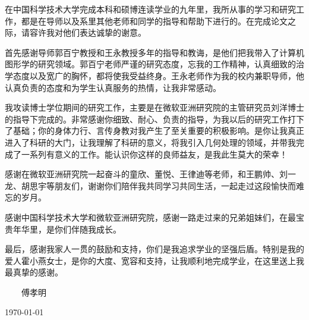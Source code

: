 ﻿
\begin{thanks}

在中国科学技术大学完成本科和硕博连读学业的九年里，我所从事的学习和研究工作，都是在导师以及系里其他老师和同学的指导和帮助下进行的。在完成论文之际，请容许我对他们表达诚挚的谢意。

首先感谢导师郭百宁教授和王永教授多年的指导和教诲，是他们把我带入了计算机图形学的研究领域。郭百宁老师严谨的研究态度，忘我的工作精神，认真细致的治学态度以及宽广的胸怀，都将使我受益终身。王永老师作为我的校内兼职导师，他认真负责的态度和为学生认真服务的热情，让我非常感动。

我攻读博士学位期间的研究工作，主要是在微软亚洲研究院的主管研究员刘洋博士的指导下完成的。非常感谢你细致、耐心、负责的指导，为我以后的研究工作打下了基础；你的身体力行、言传身教对我产生了至关重要的积极影响。是你让我真正进入了科研的大门，让我理解了科研的意义，将我引入几何处理的领域，并带我完成了一系列有意义的工作。能认识你这样的良师益友，是我此生莫大的荣幸！

感谢在微软亚洲研究院一起奋斗的童欣、董悦、王律迪等老师，和王鹏帅、刘一龙、胡思宇等朋友们，谢谢你们陪伴我共同学习共同生活，一起走过这段愉快而难忘的岁月。

感谢中国科学技术大学和微软亚洲研究院，感谢一路走过来的兄弟姐妹们，在最宝贵年华里，是你们伴随我成长。

最后，感谢我家人一贯的鼓励和支持，你们是我追求学业的坚强后盾。特别是我的爱人霍小燕女士，是你的大度、宽容和支持，让我顺利地完成学业，在这里送上我最真挚的感谢。

\vskip 18pt

\begin{flushright}

~~~~傅孝明~~~~

\today

\end{flushright}

\end{thanks}
